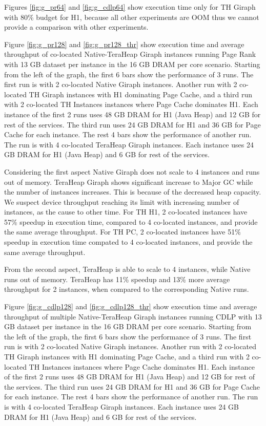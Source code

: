 Figures \ref{fig:g_pr64} and \ref{fig:g_cdlp64} show execution time only for TH Giraph with 80\% budget for H1, because all other experiments are
OOM thus we cannot provide a comparison with other experiments.

Figure \ref{fig:g_pr128} and \ref{fig:g_pr128_thr} show execution time and average throughput of co-located
Native-TeraHeap Giraph instances running Page Rank with 13 GB
dataset per instance in the 16 GB DRAM per core scenario.
Starting from the left of the graph, the first 6 bars show the
performance of 3 runs. The first run is with 2 co-located Native Giraph instances.
Another run with 2 co-located TH Giraph instances with H1 dominating Page Cache,
and a third run with 2 co-located TH Instances instances where Page Cache dominates H1.
Each instance of the first 2 runs uses 48 GB DRAM for H1 (Java Heap) and 12 GB for rest of the services.
The third run uses 24 GB DRAM for H1 and 36 GB for Page Cache for each instance.
The rest 4 bars show the performance of another run. The run is with 4 co-located TeraHeap Giraph instances.
Each instance uses 24 GB DRAM for H1 (Java Heap) and 6 GB for rest of the services.


Considering the first aspect Native Giraph does not scale to 4 instances and runs out of memory. TeraHeap Giraph shows significant increase to Major GC while the number of instances increases. This is because of the decreased heap capacity. We suspect device throughput reaching its limit with increasing number of instances, as the cause to other time. For TH H1, 2 co-located instances have 57\% speedup in execution time, compared to 4 co-located instances, and provide the same average throughput. For TH PC, 2 co-located instances have 51\% speedup in execution time compated to 4 co-located instances, and provide the same average throughput.

From the second aspect, TeraHeap is able to scale to 4 instances, while Native runs out of memory. TeraHeap has 11\% speedup and 13\% more average throughput for 2 instances, when compared to the corresponding Native runs.

Figure \ref{fig:g_cdlp128} and \ref{fig:g_cdlp128_thr} show execution time and average throughput of multiple
Native-TeraHeap Giraph instances running CDLP with 13 GB
dataset per instance in the 16 GB DRAM per core scenario.
Starting from the left of the graph, the first 6 bars show the
performance of 3 runs. The first run is with 2 co-located Native Giraph instances.
Another run with 2 co-located TH Giraph instances with H1 dominating Page Cache,
and a third run with 2 co-located TH Instances instances where Page Cache dominates H1.
Each instance of the first 2 runs uses 48 GB DRAM for H1 (Java Heap) and 12 GB for rest of the services.
The third run uses 24 GB DRAM for H1 and 36 GB for Page Cache for each instance.
The rest 4 bars show the performance of another run. The run is with 4 co-located TeraHeap Giraph instances.
Each instance uses 24 GB DRAM for H1 (Java Heap) and 6 GB for rest of the services.

